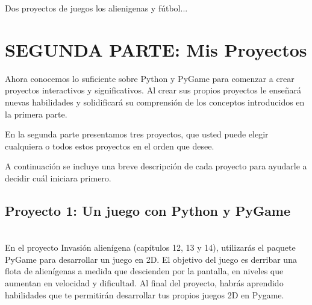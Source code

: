 {%










Dos proyectos de juegos los alienigenas y fútbol... 


\chapter*{SEGUNDA PARTE: Mis Proyectos}%

Ahora conocemos  lo suficiente sobre Python y PyGame para comenzar a crear proyectos interactivos y significativos. 
Al crear sus propios proyectos le enseñará nuevas habilidades y solidificará su comprensión de los conceptos 
introducidos en la primera parte.

En la segunda parte presentamos tres  proyectos, que usted puede elegir cualquiera o todos estos proyectos en el orden que desee. 

A continuación se incluye una breve descripción de cada proyecto para ayudarle a decidir cuál iniciara primero.

\section*{Proyecto 1: Un juego con Python y PyGame}
\\
En el proyecto Invasión alienígena (capítulos 12, 13 y 14), utilizarás el paquete PyGame para desarrollar un juego en 2D. 
El objetivo del juego es derribar una flota de alienígenas a medida que descienden por la pantalla, en niveles que aumentan 
en velocidad y dificultad. Al final del proyecto, habrás aprendido habilidades que te permitirán desarrollar tus propios 
juegos 2D en Pygame.\\

}
